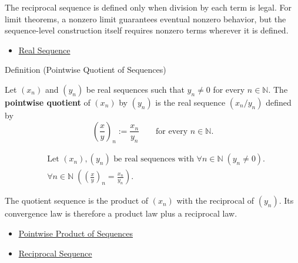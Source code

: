 \begin{remark*}[Interpretation]
The reciprocal sequence is defined only when division by each term is legal.
For limit theorems, a nonzero limit guarantees eventual nonzero behavior, but
the sequence-level construction itself requires nonzero terms wherever it is
defined.
\end{remark*}

\begin{dependencies}
\begin{itemize}
  \item \hyperref[def:real-sequence]{Real Sequence}
\end{itemize}
\end{dependencies}


\begin{definitionbox}{Definition (Pointwise Quotient of Sequences)}
\begin{definition}
\label{def:pointwise-quotient-sequence}
Let $(x_n)$ and $(y_n)$ be real sequences such that $y_n\neq 0$ for every
$n\in\mathbb{N}$. The \textbf{pointwise quotient} of $(x_n)$ by $(y_n)$ is
the real sequence $(x_n/y_n)$ defined by
\[
\left(\frac{x}{y}\right)_n := \frac{x_n}{y_n}
\qquad
\text{for every } n\in\mathbb{N}.
\]
\end{definition}
\end{definitionbox}

\begin{remark*}
\[
\begin{aligned}
&\text{Let } (x_n),(y_n) \text{ be real sequences with }
  \forall n\in\mathbb{N}\;(y_n\neq 0).\\
&\forall n\in\mathbb{N}\;
\left(\left(\frac{x}{y}\right)_n=\frac{x_n}{y_n}\right).
\end{aligned}
\]
\end{remark*}

\begin{remark*}[Interpretation]
The quotient sequence is the product of $(x_n)$ with the reciprocal of
$(y_n)$. Its convergence law is therefore a product law plus a reciprocal law.
\end{remark*}

\begin{dependencies}
\begin{itemize}
  \item \hyperref[def:pointwise-product-sequence]{Pointwise Product of Sequences}
  \item \hyperref[def:reciprocal-sequence]{Reciprocal Sequence}
\end{itemize}
\end{dependencies}

